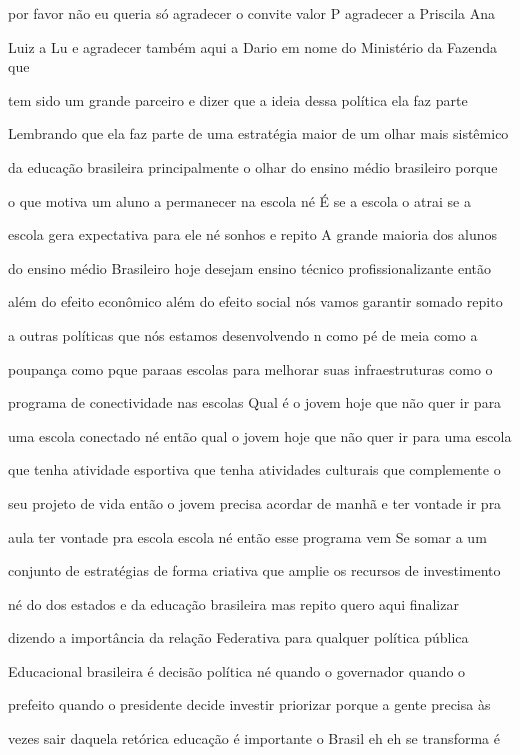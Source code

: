 \documentclass[a4paper,12pt]{article}
\begin{document}
por favor não eu queria só agradecer o convite valor P agradecer a Priscila Ana

Luiz a Lu e agradecer também aqui a Dario em nome do Ministério da Fazenda que

tem sido um grande parceiro e dizer que a ideia dessa política ela faz parte

Lembrando que ela faz parte de uma estratégia maior de um olhar mais sistêmico

da educação brasileira principalmente o olhar do ensino médio brasileiro porque

o que motiva um aluno a permanecer na escola né É se a escola o atrai se a

escola gera expectativa para ele né sonhos e repito A grande maioria dos alunos

do ensino médio Brasileiro hoje desejam ensino técnico profissionalizante então

além do efeito econômico além do efeito social nós vamos garantir somado repito

a outras políticas que nós estamos desenvolvendo n como pé de meia como a

poupança como pque paraas escolas para melhorar suas infraestruturas como o

programa de conectividade nas escolas Qual é o jovem hoje que não quer ir para

uma escola conectado né então qual o jovem hoje que não quer ir para uma escola

que tenha atividade esportiva que tenha atividades culturais que complemente o

seu projeto de vida então o jovem precisa acordar de manhã e ter vontade ir pra

aula ter vontade pra escola escola né então esse programa vem Se somar a um

conjunto de estratégias de forma criativa que amplie os recursos de investimento

né do dos estados e da educação brasileira mas repito quero aqui finalizar

dizendo a importância da relação Federativa para qualquer política pública

Educacional brasileira é decisão política né quando o governador quando o

prefeito quando o presidente decide investir priorizar porque a gente precisa às

vezes sair daquela retórica educação é importante o Brasil eh eh se transforma é
\end{document}
